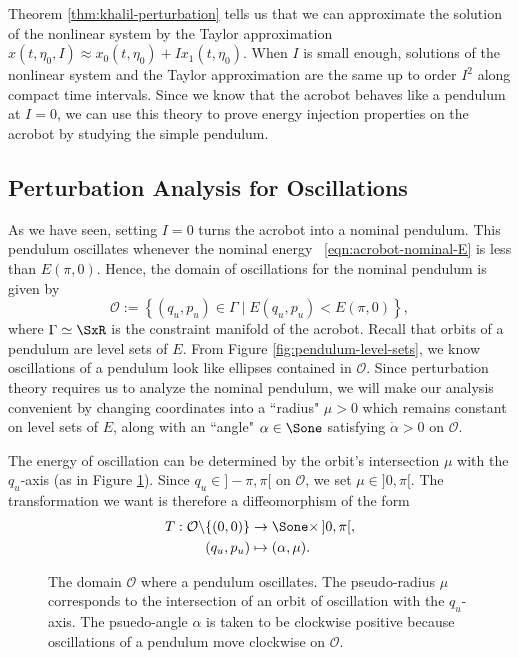 Theorem \ref{thm:khalil-perturbation} tells us that we can approximate the
solution of the nonlinear system by the Taylor approximation 
\(x(t,\eta_0,I) \approx x_0(t,\eta_0) + I x_1(t,\eta_0)\).
When \(I\) is small enough, solutions of the nonlinear system and
the Taylor approximation are the same up to order \(I^2\) along compact time
intervals.
Since we know that the acrobot behaves like a pendulum at \(I = 0\), we can
use this theory to prove energy injection properties on the acrobot by studying
the simple pendulum.
 
\subsection*{Perturbation Analysis for Oscillations}
As we have seen, setting \(I = 0\) turns the acrobot into a nominal pendulum. 
This pendulum oscillates whenever the nominal energy
~\eqref{eqn:acrobot-nominal-E} is less than \(E(\pi,0)\). 
Hence, the domain of oscillations for the nominal pendulum is given by
\[
    \mathcal{O} := \left\{ (q_u,p_u) \in \Gamma \mid E(q_u,p_u) < E(\pi,0)\right\}
    ,
\]
where \(\Gamma \simeq \SxR\) is the constraint manifold of the
acrobot.
Recall that orbits of a pendulum are level sets of \(E\). 
From Figure \ref{fig:pendulum-level-sets}, we know oscillations of a pendulum
look like ellipses contained in \(\mathcal{O}\).
Since perturbation theory requires us to analyze the nominal pendulum, we will
make our analysis convenient by changing coordinates into a
``radius" \(\mu > 0\) which remains constant on level sets of \(E\), 
along with an ``angle" \(\alpha \in \Sone\) satisfying \(\dot{\alpha} > 0\) on
\(\mathcal{O}\).

The energy of oscillation can be determined by the orbit's intersection
\(\mu\) with the \(q_u\)-axis (as in Figure \ref{fig:mu-intersection}).
Since \(q_u \in ]-\pi,\pi[\) on \(\mathcal{O}\), we set \(\mu \in ]0,\pi[\).
The transformation we want is therefore a diffeomorphism of the form
\begin{align*}
    T : \mathcal{O} \backslash \{(0,0)\} &\rightarrow \Sone \times \, ]0,\pi[, \\
    (q_u, p_u) &\mapsto (\alpha,\mu)
    .
\end{align*}

\begin{figure}
    \centering
    \caption{The domain \(\mathcal{O}\) where a pendulum oscillates.
    The pseudo-radius \(\mu\) corresponds to the
    intersection of an orbit of oscillation with the \(q_u\)-axis.
    The psuedo-angle \(\alpha\) is taken to be clockwise positive because 
    oscillations of a pendulum move clockwise on \(\mathcal{O}\).}
    \label{fig:mu-intersection}
\end{figure}

